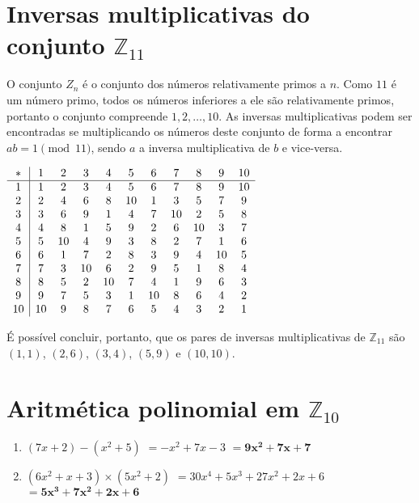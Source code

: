 \documentclass[12pt]{article}
\begin{document}
\section{Inversas multiplicativas do conjunto $\mathbb{Z}_{11}$}

O conjunto $Z_{n}$ é o conjunto dos números relativamente primos a $n$. Como
$11$ é um número primo, todos os números inferiores a ele são relativamente
primos, portanto o conjunto compreende ${1, 2, \ldots, 10}$. As inversas
multiplicativas podem ser encontradas se multiplicando os números deste
conjunto de forma a encontrar $ab = 1 \pmod{11}$, sendo $a$ a inversa
multiplicativa de $b$ e vice-versa.

\begin{center}
    $\begin{array}{ c | c c c c c c c c c c }
        *  & 1 & 2 & 3 & 4 & 5 & 6 & 7 & 8 & 9 & 10 \\ \hline
        1  & 1 & 2 & 3 & 4 & 5 & 6 & 7 & 8 & 9 & 10 \\
        2  & 2 & 4 & 6 & 8 & 10 & 1 & 3 & 5 & 7 & 9 \\
        3  & 3 & 6 & 9 & 1 & 4 & 7 & 10 & 2 & 5 & 8 \\
        4  & 4 & 8 & 1 & 5 & 9 & 2 & 6 & 10 & 3 & 7 \\
        5  & 5 & 10 & 4 & 9 & 3 & 8 & 2 & 7 & 1 & 6 \\
        6  & 6 & 1 & 7 & 2 & 8 & 3 & 9 & 4 & 10 & 5 \\
        7  & 7 & 3 & 10 & 6 & 2 & 9 & 5 & 1 & 8 & 4 \\
        8  & 8 & 5 & 2 & 10 & 7 & 4 & 1 & 9 & 6 & 3 \\
        9  & 9 & 7 & 5 & 3 & 1 & 10 & 8 & 6 & 4 & 2 \\
        10 & 10 & 9 & 8 & 7 & 6 & 5 & 4 & 3 & 2 & 1 \\
    \end{array}$
\end{center}

É possível concluir, portanto, que os pares de inversas multiplicativas de
$\mathbb{Z}_{11}$ são $(1, 1)$, $(2, 6)$, $(3, 4)$, $(5, 9)$ e $(10, 10)$.

\section{Aritmética polinomial em $\mathbb{Z}_{10}$}

\begin{enumerate}[label=\textbf{\alph*})]
    \setlength\itemsep{1em}

    \item $(7x+2)-(x^{2}+5)$
        $= -x^{2}+7x-3$
        $= \boldsymbol{9x^{2}+7x+7}$

    \item $(6x^{2}+x+3) \times (5x^{2}+2)$
        $= 30x^{4}+5x^{3}+27x^{2}+2x+6$
        $= \boldsymbol{5x^{3}+7x^{2}+2x+6}$
\end{enumerate}
\end{document}
